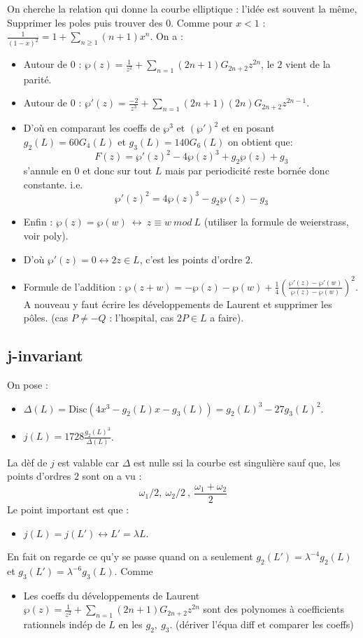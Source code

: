 \documentclass[12pt]{article}
\theoremstyle{plain}
\theoremstyle{definition}
\theoremstyle{remark}
\newcommand{\w}{\omega}
\begin{document}
On cherche la relation qui donne la courbe elliptique : l'idée est souvent la même, 
Supprimer les poles puis trouver des 0. Comme pour $x<1$ : $\frac{1}{(1-x)^2}=1+\sum_{n\geq1} (n+1)x^n$. On a :
\begin{itemize}
    \item Autour de $0$ : $\wp(z)=\frac{1}{z^2} + \sum_{n=1} (2n+1)G_{2n+2}z^{2n}$, le $2$ vient de la parité.
    \item Autour de $0$ : $\wp '(z)=\frac{-2}{z^3} + \sum_{n=1}(2n+1)(2n)G_{2n+2}z^{2n-1}$.
    \item D'où en comparant les coeffs de $\wp^3$ et $(\wp ')^2$ et en posant $g_2(L)=60G_4(L)$ et $g_3(L)=140G_6(L)$ on obtient que:
    $$F(z)=\wp '(z)^2-4\wp(z)^3+g_2\wp(z)+g_3$$
s'annule en $0$ et donc sur tout $L$ mais par periodicité reste bornée donc constante. i.e. $$\wp '(z)^2=4\wp(z)^3-g_2\wp(z)-g_3$$
    \item Enfin : $\wp(z)=\wp(w)~\leftrightarrow~z\equiv w~mod~L$ (utiliser la formule de weierstrass, voir poly).
    \item D'où $\wp '(z)=0\leftrightarrow 2z\in L$, c'est les points d'ordre $2$.
    \item Formule de l'addition : $\wp(z+w)=-\wp(z)-\wp(w)+\frac{1}{4}(\frac{\wp '(z)-\wp '(w)}{\wp(z)-\wp(w)})^2$. A nouveau y faut écrire les
    développements de Laurent et supprimer les pôles. (cas $P\ne-Q$ : l'hospital, cas $2P\in L$ a faire).  
\end{itemize}

\subsection{j-invariant}
On pose :
\begin{itemize}
    \item $\Delta(L)=\textrm{Disc}(4x^3-g_2(L)x-g_3(L))=g_2(L)^3-27g_3(L)^2$.
    \item $j(L)=1728\frac{g_2(L)^3}{\Delta(L)}$.
\end{itemize}

La dèf de $j$ est valable car $\Delta$ est nulle ssi la courbe est singulière sauf que, les points d'ordres $2$ sont on a vu :$$\w_1/2,~\w_2/2~,~\frac{\w_1+\w_2}{2}$$
Le point important est que :\begin{itemize}
    \item $j(L)=j(L')\leftrightarrow L'=\lambda L$.
\end{itemize}

En fait on regarde ce qu'y se passe quand on a seulement $g_2(L')=\lambda^{-4}g_2(L)$ et $g_3(L')=\lambda^{-6}g_3(L)$. Comme 
\begin{itemize}
    \item Les coeffs du développements de Laurent $\wp(z)=\frac{1}{z^2} + \sum_{n=1} (2n+1)G_{2n+2}z^{2n}$ sont des polynomes
    à coefficients rationnels indép de $L$ en les $g_2,~g_3$. (dériver l'équa diff et comparer les coeffs)
\end{itemize}
\end{document}
